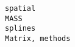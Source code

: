 \documentclass[
  letterpaper,
  DIV=11,
  numbers=noendperiod]{scrreprt}
\begin{document}
\begin{verbatim}
spatial                                                                                                                                                                                                                                                                                                                                                                                                                                                                                                                                                                                                                                                                                                                                                                                                                                                                                                                                                                                                                                                                                                                                                                                                                                                                                                  MASS
splines                                                                                                                                                                                                                                                                                                                                                                                                                                                                                                                                                                                                                                                                                                                                                                                                                                                                                                                                                                                                                                                                                                                                                                                                                                                                                       Matrix, methods

\end{verbatim}
\end{document}

